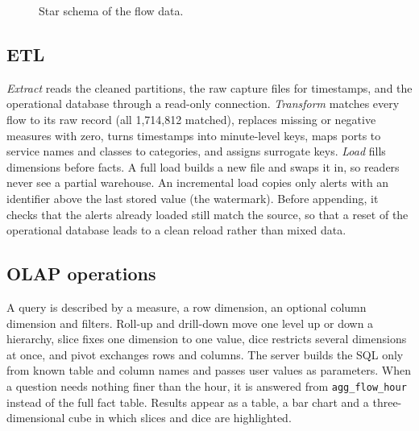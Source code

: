 \documentclass[conference]{IEEEtran}
\begin{document}
\begin{figure}[t]
\centering
{}
\caption{Star schema of the flow data.}
\label{fig:star}
\end{figure}

\subsection{ETL}
\emph{Extract} reads the cleaned partitions, the raw capture files for timestamps, and the
operational database through a read-only connection. \emph{Transform} matches every flow to its
raw record (all 1,714,812 matched), replaces missing or negative measures with zero, turns
timestamps into minute-level keys, maps ports to service names and classes to categories, and
assigns surrogate keys. \emph{Load} fills dimensions before facts. A full load builds a new file
and swaps it in, so readers never see a partial warehouse. An incremental load copies only alerts
with an identifier above the last stored value (the watermark). Before appending, it checks that
the alerts already loaded still match the source, so that a reset of the operational database
leads to a clean reload rather than mixed data.

\subsection{OLAP operations}
A query is described by a measure, a row dimension, an optional column dimension and filters.
Roll-up and drill-down move one level up or down a hierarchy, slice fixes one dimension to one
value, dice restricts several dimensions at once, and pivot exchanges rows and columns. The
server builds the SQL only from known table and column names and passes user values as
parameters. When a question needs nothing finer than the hour, it is answered from
\texttt{agg\_flow\_hour} instead of the full fact table. Results appear as a table, a bar chart and
a three-dimensional cube in which slices and dice are highlighted.
\end{document}
